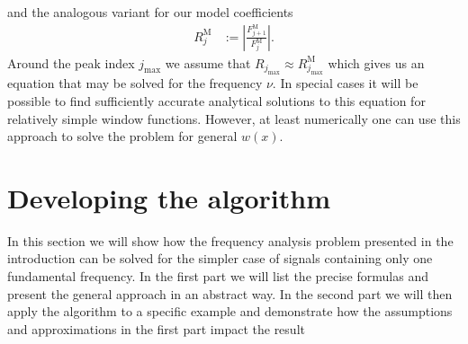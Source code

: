 \documentclass[english, parskip=full]{scrartcl}     %
\newcommand{\tecxt}{}
\begin{document}
and the analogous variant for our model coefficients
\begin{align}
R_j^\text{M} &:= \left\vert \frac{F_{j+1}^\text{M}}{F_j^\text{M}} \right\vert. \label{eqn:definition ratio fft M j+1 to fft M j}
\end{align}
Around the peak index $j_\mathrm{max}$ we assume that $R_{j_\tecxt\text{max}} \approx R_{j_\tecxt\text{max}}^\tecxt\text{M}$ which gives us an equation that may be solved for the frequency $\nu$.
In special cases it will be possible to find sufficiently accurate analytical solutions to this equation for relatively simple window functions.
However, at least numerically one can use this approach to solve the problem for general $w(x)$.
\section{Developing the algorithm}
In this section we will show how the frequency analysis problem presented in the introduction can be solved for the simpler case of signals containing only one fundamental frequency.
In the first part we will list the precise formulas and present the general approach in an abstract way.
In the second part we will then apply the algorithm to a specific example and demonstrate how the assumptions and approximations in the first part impact the result
\end{document}
